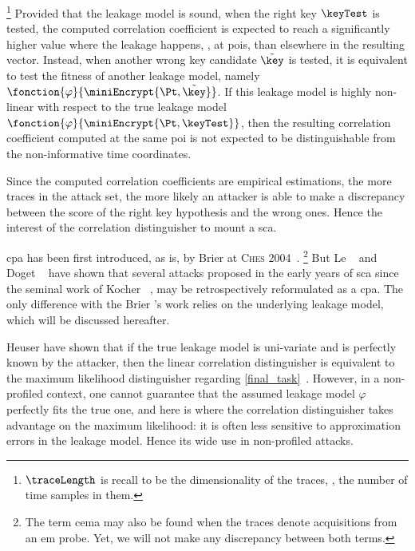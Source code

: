 \footnote{
    \(\traceLength\) is recall to be the dimensionality of the traces, \ie{}, the number of time samples in them.
}
Provided that the leakage model is sound, when the right key \(\keyTest\) is tested, the computed correlation coefficient is expected to reach a significantly higher value where the leakage happens, \ie{}, at \glspl{poi}, than elsewhere in the resulting vector.
Instead, when another wrong key candidate \(\tilde{\key}\) is tested, it is equivalent to test the fitness of another leakage model, namely \(\fonction{\varphi}{\miniEncrypt{\Pt, \tilde{\key}}}\).
If this leakage model is highly non-linear with respect to the true leakage model \(\fonction{\varphi}{\miniEncrypt{\Pt, \keyTest}}\), then the resulting correlation coefficient computed at the same \gls{poi} is not expected to be distinguishable from the non-informative time coordinates.

Since the computed correlation coefficients are empirical estimations, the more traces in the attack set, the more likely an attacker is able to make a discrepancy between the score of the right key hypothesis and the wrong ones.
Hence the interest of the correlation distinguisher to mount a \gls{sca}.

\gls{cpa} has been first introduced, as is, by Brier \etal{} at \textsc{Ches} 2004~\cite{brier_correlation_2004}.%
\footnote{
    The term \gls{cema} may also be found when the traces denote acquisitions from an \gls{em} probe.
    Yet, we will not make any discrepancy between both terms.
}
But Le \etal{}~\cite{le_proposition_2006} and Doget \etal{}~\cite{doget_univariate_2011} have shown that several attacks proposed in the early years of \gls{sca} since the seminal work of Kocher \etal{}~\cite{kocher_dpa_1999}, may be retrospectively reformulated as a \gls{cpa}.
The only difference with the Brier \etal{}'s work relies on the underlying leakage model, which will be discussed hereafter.


Heuser \etal{} have shown that if the true leakage model is uni-variate and is perfectly known by the attacker, then the linear correlation distinguisher is equivalent to the maximum likelihood distinguisher regarding \autoref{final_task}~\cite{heuser_good_2014}.
However, in a non-profiled context, one cannot guarantee that the assumed leakage model \(\varphi\) perfectly fits the true one, and here is where the correlation distinguisher takes advantage on the maximum likelihood: it is often less sensitive to approximation errors in the leakage model.
Hence its wide use in non-profiled attacks.

